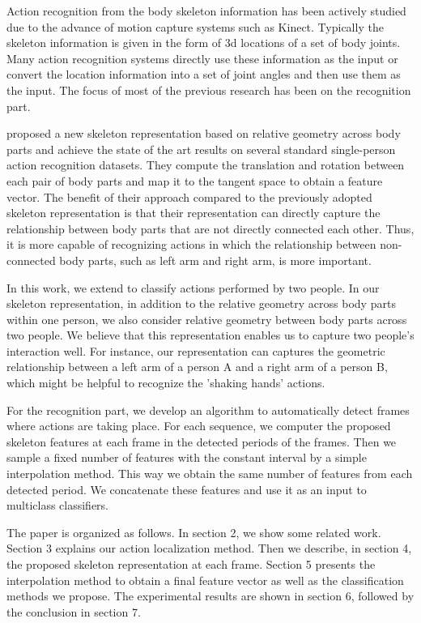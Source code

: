 \documentclass[10pt,twocolumn,letterpaper]{article}
\begin{document}
Action recognition from the body skeleton information has been actively studied due to the advance of motion capture systems such as Kinect. Typically the skeleton information is given in the form of 3d locations of a set of body joints. Many action recognition systems directly use these information as the input or convert the location information into a set of joint angles and then use them as the input. The focus of most of the previous research has been on the recognition part. 

\cite{Vemulapalli2013} proposed a new skeleton representation based on relative geometry across body parts and achieve the state of the art results on several standard single-person action recognition datasets. They compute the translation and rotation between each pair of body parts and map it to the tangent space to obtain a feature vector. The benefit of their approach compared to the previously adopted skeleton representation is that their representation can directly capture the relationship between body parts that are not directly connected each other. Thus, it is more capable of recognizing actions in which the relationship between non-connected body parts, such as left arm and right arm, is more important.

In this work, we extend \cite{Vemulapalli2013} to classify actions performed by two people. In our skeleton representation, in addition to the relative geometry across body parts within one person, we also consider relative geometry between body parts across two people. We believe that this representation enables us to capture two people's interaction well. For instance, our representation can captures the geometric relationship between a left arm of a person A and a right arm of a person B, which might be helpful to recognize the 'shaking hands' actions.

For the recognition part, we develop an algorithm to automatically detect frames where actions are taking place. For each sequence, we computer the proposed skeleton features at each frame in the detected periods of the frames. Then we sample a fixed number of features with the constant interval by a simple interpolation method. This way we obtain the same number of features from each detected period. We concatenate these features and use it as an input to multiclass classifiers.

The paper is organized as follows. In section 2, we show some related work. Section 3 explains our action localization method. Then we describe, in section 4, the proposed skeleton representation at each frame. Section 5 presents the interpolation method to obtain a final feature vector as well as the classification methods we propose. The experimental results are shown in section 6, followed by the conclusion in section 7.
\end{document}
